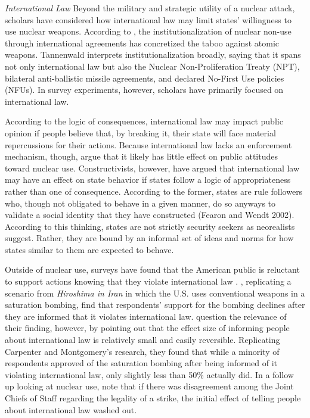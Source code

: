 \documentclass[12pt]{article}
\begin{document}
\textit{International Law}
\noindent
Beyond the military and strategic utility of a nuclear attack, scholars have considered how international law may limit states' willingness to use nuclear weapons. According to \citet{tannenwald_nuclear_2007}, the institutionalization of nuclear non-use through international agreements has concretized the taboo against atomic weapons. Tannenwald interprets institutionalization broadly, saying that it spans not only international law but also the Nuclear Non-Proliferation Treaty (NPT), bilateral anti-ballistic missile agreements, and declared No-First Use policies (NFUs). In survey experiments, however, scholars have primarily focused on international law.

According to the logic of consequences, international law may impact public opinion if people believe that, by breaking it, their state will face material repercussions for their actions. Because international law lacks an enforcement mechanism, though, \citet{sagan_does_2020} argue that it likely has little effect on public attitudes toward nuclear use. Constructivists, however, have argued that international law may have an effect on state behavior if states follow a logic of appropriateness rather than one of consequence. According to the former, states are rule followers who, though not obligated to behave in a given manner, do so anyways to validate a social identity that they have constructed (Fearon and Wendt 2002). According to this thinking, states are not strictly security seekers as neorealists suggest. Rather, they are bound by an informal set of ideas and norms for how states similar to them are expected to behave. 

Outside of nuclear use, surveys have found that the American public is reluctant to support actions knowing that they violate international law \citep{chilton_laws_2014, kreps_flying_2014}. \citet{carpenter_stopping_2020}, replicating a scenario from \textit{Hiroshima in Iran} in which the U.S. uses conventional weapons in a saturation bombing, find that respondents' support for the bombing declines after they are informed that it violates international law. \citet{sagan_does_2020} question the relevance of their finding, however, by pointing out that the effect size of informing people about international law is relatively small and easily reversible. Replicating Carpenter and Montgomery's research, they found that while a minority of respondents approved of the saturation bombing after being informed of it violating international law, only slightly less than 50\% actually did. In a follow up looking at nuclear use, \citet{sagan_atomic_2024} note that if there was disagreement among the Joint Chiefs of Staff regarding the legality of a strike, the initial effect of telling people about international law washed out.
\end{document}
